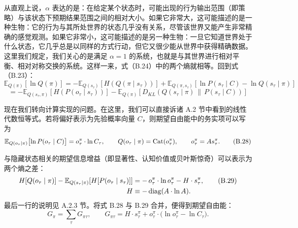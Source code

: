 从直观上说，$\alpha$ 表达的是：在给定某个状态时，可能出现的行为输出范围（即策略）与该状态下预期结果范围之间的相对大小。如果它非常大，这可能描述的是一种生物：它的行为与其所处世界的状态几乎没有关系，尽管该世界又能产生非常精确的感觉观测。如果它非常小，这可能描述的是另一种生物：一旦它知道世界处于什么状态，它几乎总是以同样的方式行动，但它又很少能从世界中获得精确数据。这里我们规定，我们关心的是满足 $\alpha=1$ 的系统，也就是与其世界进行相对平衡、相对对称交换的系统。这样一来，式（B.24）中的两个熵就相等。回到式（B.23）：
\begin{equation}
\mathbb{E}_{Q(\pi)}[\ln Q(\pi)]
=
-\mathbb{E}_{Q(s_\tau)}\!\left[H\!\left(Q(\pi\mid s_\tau)\right)\right]
+\mathbb{E}_{Q(\pi,s_\tau)}\!\left[\ln P(s_\tau\mid C)-\ln Q(s_\tau\mid \pi)\right]
\tag{B.25}
\end{equation}
\begin{equation}
=
-\mathbb{E}_{Q(s_\tau,\pi)}\!\left[H\!\left(P(o_\tau\mid s_\tau)\right)\right]
-\mathbb{E}_{Q(\pi)}\!\left[D_{KL}\!\left(Q(s_\tau\mid \pi)\,\|\,P(s_\tau\mid C)\right)\right]
\tag{B.25续}
\end{equation}

现在我们转向计算实现的问题。在这里，我们可以直接诉诸 A.2 节中看到的线性代数恒等式。若将偏好表示为先验概率向量 $C$，则期望自由能中的务实项可以写为
\begin{equation}
\mathbb{E}_{Q(o_\tau \mid \pi)}\bigl[\ln P(o_\tau \mid C)\bigr]
= o_\tau^{\pi} \cdot \ln C_\tau,
\qquad
Q(o_\tau \mid \pi) = \operatorname{Cat}(o_\tau^{\pi}),
\qquad
o_\tau^{\pi} = A s_\tau^{\pi}.
\tag{B.28}
\end{equation}

与隐藏状态相关的期望信息增益（即显著性、认知价值或贝叶斯惊奇）可以表示为两个熵之差：
\begin{align}
H\!\left[Q(o_\tau \mid \pi)\right]
 - \mathbb{E}_{Q(s_\tau \mid \pi)}\!\left[ H\!\left[P(o_\tau \mid s_\tau)\right]\right]
&= -\, o_\tau^{\pi} \cdot \ln o_\tau^{\pi} - H \cdot s_\tau^{\pi},
\tag{B.29}\\
H &\equiv -\operatorname{diag}(A \cdot \ln A).
\nonumber
\end{align}
最后一行的说明见 A.2.3 节。将式 B.28 与 B.29 合并，便得到期望自由能：
\begin{equation}
G_\pi = \sum_\tau G_{\pi\tau},
\qquad
G_{\pi\tau} = H \cdot s_\tau^{\pi} + o_\tau^{\pi} \cdot \bigl(\ln o_\tau^{\pi} - \ln C_\tau \bigr).
\tag{B.30}
\end{equation}

